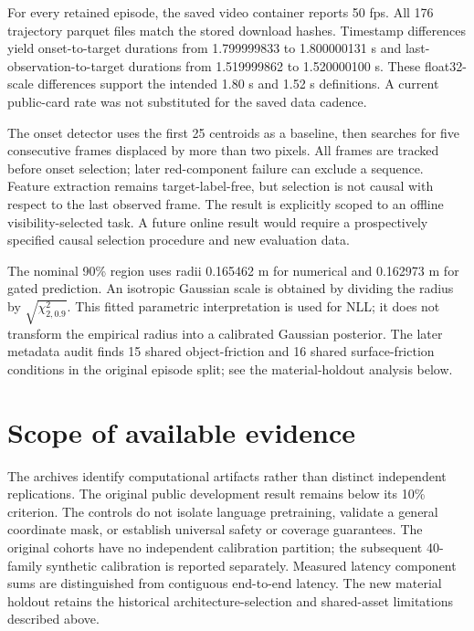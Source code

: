 \documentclass[11pt]{article}
\begin{document}
For every retained episode, the saved video container reports 50 fps. All 176 trajectory parquet files match the stored download hashes. Timestamp differences yield onset-to-target durations from 1.799999833 to 1.800000131 s and last-observation-to-target durations from 1.519999862 to 1.520000100 s. These float32-scale differences support the intended 1.80 s and 1.52 s definitions. A current public-card rate was not substituted for the saved data cadence.

The onset detector uses the first 25 centroids as a baseline, then searches for five consecutive frames displaced by more than two pixels. All frames are tracked before onset selection; later red-component failure can exclude a sequence. Feature extraction remains target-label-free, but selection is not causal with respect to the last observed frame. The result is explicitly scoped to an offline visibility-selected task. A future online result would require a prospectively specified causal selection procedure and new evaluation data.

The nominal 90\% region uses radii 0.165462 m for numerical and 0.162973 m for gated prediction. An isotropic Gaussian scale is obtained by dividing the radius by $\sqrt{\chi^2_{2,0.9}}$. This fitted parametric interpretation is used for NLL; it does not transform the empirical radius into a calibrated Gaussian posterior. The later metadata audit finds 15 shared object-friction and 16 shared surface-friction conditions in the original episode split; see the material-holdout analysis below.











\section{Scope of available evidence}
The archives identify computational artifacts rather than distinct independent replications. The original public development result remains below its 10\% criterion. The controls do not isolate language pretraining, validate a general coordinate mask, or establish universal safety or coverage guarantees. The original cohorts have no independent calibration partition; the subsequent 40-family synthetic calibration is reported separately. Measured latency component sums are distinguished from contiguous end-to-end latency. The new material holdout retains the historical architecture-selection and shared-asset limitations described above.
\end{document}

